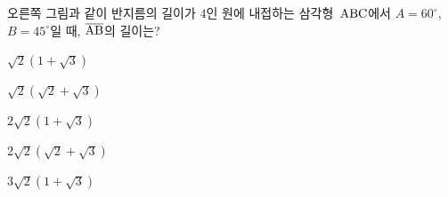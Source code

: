 \noindent\begin{minipage}[t]{0.58\linewidth}\vspace{0pt}\raggedright 오른쪽 그림과 같이 반지름의 길이가 $4$인 원에 내접하는 삼각형~$\mathrm{ABC}$에서 $A=60^\circ$, $B=45^\circ$일 때, $\overline{\mathrm{AB}}$의 길이는?\end{minipage}\hfill\begin{minipage}[t]{0.4\linewidth}\vspace{0pt}\centering \resizebox{\ifdim\width>\linewidth\linewidth\else\width\fi}{!}{}\end{minipage}\par
\begin{choicesii}{\rule[-3ex]{0pt}{8ex}$\sqrt{2}(1+\sqrt{3})$}{\rule[-3ex]{0pt}{8ex}$\sqrt{2}(\sqrt{2}+\sqrt{3})$}{\rule[-3ex]{0pt}{8ex}$2\sqrt{2}(1+\sqrt{3})$}{\rule[-3ex]{0pt}{8ex}$2\sqrt{2}(\sqrt{2}+\sqrt{3})$}{\rule[-3ex]{0pt}{8ex}$3\sqrt{2}(1+\sqrt{3})$}\end{choicesii}
